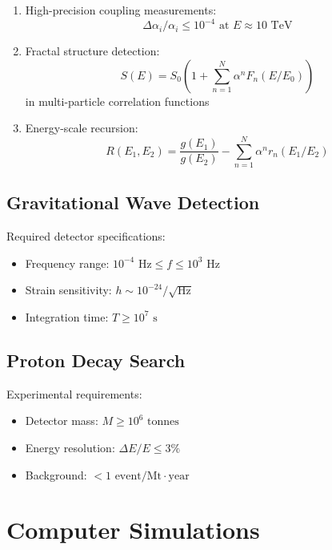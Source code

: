\documentclass{article}
\begin{document}
\begin{enumerate}
\item High-precision coupling measurements:
   \begin{equation}
   \Delta\alpha_i/\alpha_i \leq 10^{-4} \text{ at } E \approx 10\text{ TeV}
   \end{equation}

\item Fractal structure detection:
   \begin{equation}
   S(E) = S_0\left(1 + \sum_{n=1}^N \alpha^n F_n(E/E_0)\right)
   \end{equation}
   in multi-particle correlation functions

\item Energy-scale recursion:
   \begin{equation}
   R(E_1,E_2) = \frac{g(E_1)}{g(E_2)} - \sum_{n=1}^N \alpha^n r_n(E_1/E_2)
   \end{equation}
\end{enumerate}

\subsection{Gravitational Wave Detection}

Required detector specifications:

\begin{itemize}
\item Frequency range: $10^{-4} \text{ Hz} \leq f \leq 10^3 \text{ Hz}$
\item Strain sensitivity: $h \sim 10^{-24}/\sqrt{\text{Hz}}$
\item Integration time: $T \geq 10^7 \text{ s}$
\end{itemize}

\subsection{Proton Decay Search}

Experimental requirements:

\begin{itemize}
\item Detector mass: $M \geq 10^6 \text{ tonnes}$
\item Energy resolution: $\Delta E/E \leq 3\%$
\item Background: $< 1 \text{ event/Mt}\cdot\text{year}$
\end{itemize}

\section{Computer Simulations}
\label{app:simulations}
\end{document}
